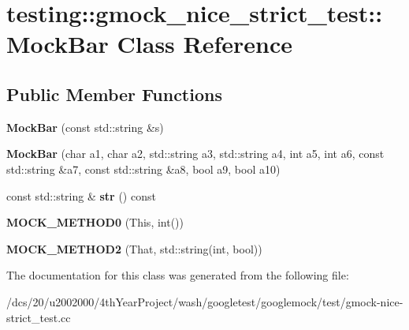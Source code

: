 \hypertarget{classtesting_1_1gmock__nice__strict__test_1_1MockBar}{}\section{testing\+:\+:gmock\+\_\+nice\+\_\+strict\+\_\+test\+:\+:Mock\+Bar Class Reference}
\label{classtesting_1_1gmock__nice__strict__test_1_1MockBar}
\subsection*{Public Member Functions}
\begin{DoxyCompactItemize}
\item 
\mbox{\label{classtesting_1_1gmock__nice__strict__test_1_1MockBar_abd4e7936dc389201ce608257f7a02584}} 
{\bfseries Mock\+Bar} (const std\+::string \&s)
\item 
\mbox{\label{classtesting_1_1gmock__nice__strict__test_1_1MockBar_ad6b73066fdcdd71ac1add73ef56b53ef}} 
{\bfseries Mock\+Bar} (char a1, char a2, std\+::string a3, std\+::string a4, int a5, int a6, const std\+::string \&a7, const std\+::string \&a8, bool a9, bool a10)
\item 
\mbox{\label{classtesting_1_1gmock__nice__strict__test_1_1MockBar_adc0fb56c042e95e1a459bb007e813169}} 
const std\+::string \& {\bfseries str} () const
\item 
\mbox{\label{classtesting_1_1gmock__nice__strict__test_1_1MockBar_a9aad688c2b1dc6b529b7c499e49e3a70}} 
{\bfseries M\+O\+C\+K\+\_\+\+M\+E\+T\+H\+O\+D0} (This, int())
\item 
\mbox{\label{classtesting_1_1gmock__nice__strict__test_1_1MockBar_afa41d45dd7066f014f755f152ec16a73}} 
{\bfseries M\+O\+C\+K\+\_\+\+M\+E\+T\+H\+O\+D2} (That, std\+::string(int, bool))
\end{DoxyCompactItemize}


The documentation for this class was generated from the following file\+:\begin{DoxyCompactItemize}
\item 
/dcs/20/u2002000/4th\+Year\+Project/wash/googletest/googlemock/test/gmock-\/nice-\/strict\+\_\+test.\+cc\end{DoxyCompactItemize}
